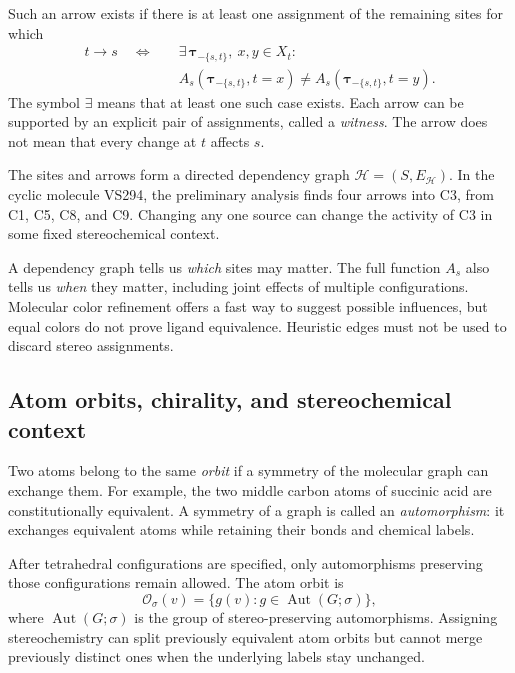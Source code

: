 \documentclass[journal=jcisd8,manuscript=article]{achemso}
\newcommand{\Aut}{\operatorname{Aut}}
\begin{document}
Such an arrow exists if there is at least one assignment of
the remaining sites for which
\begin{equation}
\begin{aligned}
t\longrightarrow s\quad\Longleftrightarrow\quad
&\exists\,\boldsymbol{\tau}_{-\{s,t\}},\ x,y\in X_t:\\
&A_s(\boldsymbol{\tau}_{-\{s,t\}},t=x)
\ne A_s(\boldsymbol{\tau}_{-\{s,t\}},t=y).
\end{aligned}
\label{eq:dependency}
\end{equation}
The symbol $\exists$ means that at least one such case exists.
Each arrow can be supported by an explicit pair of
assignments, called a \emph{witness}. The arrow does
not mean that every change at $t$ affects $s$.

The sites and arrows form a directed dependency
graph $\mathcal H=(S,E_{\mathcal H})$. In the
cyclic molecule VS294, the preliminary analysis
finds four arrows into C3, from C1, C5, C8, and C9.
Changing any one source can change the activity
of C3 in some fixed stereochemical context.

A dependency graph tells us \emph{which} sites
may matter. The full function $A_s$ also tells
us \emph{when} they matter, including joint
effects of multiple configurations. Molecular
color refinement offers a fast way to suggest
possible influences,\cite{Morgan1965} but equal
colors do not prove ligand equivalence.
Heuristic edges must not be used to discard
stereo assignments.

\subsection{Atom orbits, chirality, and stereochemical context}
\label{subsec:orbits}

Two atoms belong to the same \emph{orbit} if a symmetry
of the molecular graph can exchange them. For example,
the two middle carbon atoms of succinic acid are
constitutionally equivalent. A symmetry of a graph is
called an \emph{automorphism}: it exchanges equivalent
atoms while retaining their bonds and chemical labels.

After tetrahedral configurations are specified, only
automorphisms preserving those configurations remain
allowed. The atom orbit is
\begin{equation}
\mathcal O_{\sigma}(v)
=\{g(v):g\in\Aut(G;\sigma)\},
\label{eq:orbits}
\end{equation}
where $\Aut(G;\sigma)$ is the group of stereo-preserving
automorphisms. Assigning stereochemistry can split
previously equivalent atom orbits but cannot merge
previously distinct ones when the underlying labels
stay unchanged.
\end{document}
